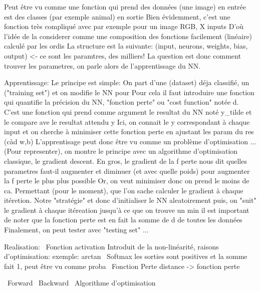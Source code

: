 \startsection[title=What is a Neural Network?]
Peut être vu comme une fonction qui prend des données (une image) en entrée est des classes (par exemple animal) en sortie
Bien évidemment, c'est une fonction très compliqué avec par exemple pour un image RGB, X inputs
D'où l'idée de la considerer comme une composition des fonctions facilement (linéaire) calculé par les ordis
La structure est la suivante: (input, neurons, weights, bias, output) <- ce sont les paramtres, des milliers!
La question est donc comment trouver les parametres, on parle alors de l'apprentissage du NN.

Apprentissage:
Le principe est simple: On part d'une (dataset) déja classifié, un ("training set") et on modifie le NN pour  
Pour cela il faut introduire une fonction qui quantifie la précision du NN, "fonction perte" ou "cost function" notée d.
C'est une fonction qui prend comme argument le resultat du NN noté y_tilde et le compare ave le resultat attendu y
Ici, on connait le y correspondant à chaque input et on cherche à minimiser cette fonction perte en ajustant les param du res (càd w,b)
L'apprentisage peut donc être vu comme un problème d'optimisation ...
(Pour representer), on montre le principe avec un algorithme d'optimisation classique, le gradient descent.
En gros, le gradient de la f perte nous dit quelles parametres faut-il augmenter et diminuer (et avec quelle poids) pour augmenter la f perte le plus plus possible
Or, on veut minimiser donc on prend le moins de ca.
Permettant (pour le moment), que l'on sache calculer le gradient à chaque itéretion.
Notre "stratégie" et donc d'initialiser le NN aleatoirement puis, on "suit" le gradient à chaque itéreation jusqu'à ce que on trouve un min 
il est important de noter que la fonction perte est en fait la somme de d de toutes les données
Finalement, on peut tester avec "testing set" ...

Realisation:
~Fonction activation
    Introduit de la non-linéarité, raisons d'optimisation: exemple: arctan
~Softmax
    les sorties sont positives et la somme fait 1, peut être vu comme proba
~Fonction Perte
    distance -> fonction perte
    
~Forward
~Backward
~Algorithme d'optimisation
\stopsection